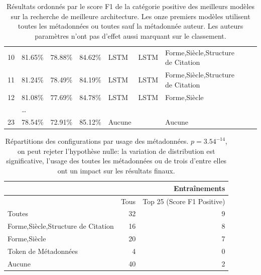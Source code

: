 \begin{table}[ht]
{\begin{tabular}{@{}lllllllll@{}}
10   & 81.65\%            & 78.88\%          & 84.62\%             & LSTM            & LSTM              & Forme,Siècle,Structure de Citation \\
11   & 81.24\%            & 78.49\%          & 84.19\%             & LSTM            & LSTM              & Forme,Siècle,Structure de Citation \\
12   & 81.08\%            & 77.69\%          & 84.78\%             & LSTM            & LSTM              & Forme,Siècle                       \\
     & …                  &                  &                     &                 &                   &                                    \\
23   & 78.54\%            & 72.91\%          & 85.12\%             & Aucune          &                   & Aucune                             \\ \bottomrule
\end{tabular}%
}
\caption{Résultats ordonnés par le score F1 de la catégorie positive des meilleurs modèles sur la recherche de meilleure architecture. Les onze premiers modèles utilisent toutes les métadonnées ou toutes sauf la métadonnée auteur. Les auteurs paramètres n'ont pas d'effet aussi marquant sur le classement.}
\label{tab:chap4:resultats-metadata}
\end{table}

\begin{table}[ht]
\centering
\begin{tabular}{l|r|r}
                                   & \multicolumn{2}{r}{Entraînements} \\ \hline
                                   & Tous & Top 25 (Score F1 Positive) \\ \hline
Toutes                             & 32   & 9                          \\
Forme,Siècle,Structure de Citation & 16   & 8                          \\
Forme,Siècle                       & 20   & 7                          \\
Token de Métadonnées               & 4    & 0                          \\
Aucune                             & 40   & 2                          \\ \hline
\end{tabular}
\caption{Répartitions des configurations par usage des métadonnées. $p=3.54^{-14}$, on peut rejeter l'hypothèse nulle: la variation de distribution est significative, l'usage des toutes les métadonnées ou de trois d'entre elles ont un impact sur les résultats finaux.}
\label{tab:chap4:metadata-p-value}
\end{table}

